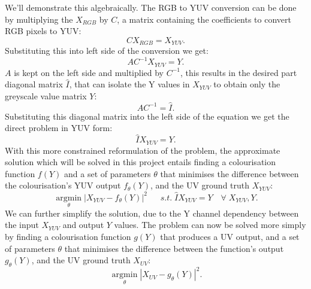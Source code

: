 \documentclass{l4proj}
\begin{document}
We'll demonstrate this algebraically. The RGB to YUV conversion can be done by multiplying the $X_{RGB}$ by $C$, a matrix containing the coefficients to convert RGB pixels to YUV:
\begin{equation}
    C X_{RGB} = X_{YUV}.
\end{equation}
Substituting this into left side of the conversion we get:
\begin{equation}
    A C^{-1} X_{YUV} = Y.
\end{equation}
$A$ is kept on the left side and multiplied by $C^{-1}$, this results in the desired part diagonal matrix $\hat{I}$, that can isolate the Y values in $X_{YUV}$ to obtain only the greyscale value matrix $Y$:
\begin{equation}
    A C^{-1} = \hat{I}.
\end{equation}
Substituting this diagonal matrix into the left side of the equation we get the direct problem in YUV form:
\begin{equation}
    \hat{I} X_{YUV} = Y.
\end{equation}
With this more constrained reformulation of the problem, the approximate solution which will be solved in this project entails finding a colourisation function $f(Y)$ and a set of parameters $\theta$ that minimises the difference between the colourisation's YUV output $f_{\theta}(Y)$, and the UV ground truth $X_{YUV}$:
\begin{equation}
    \underset{\theta}{\operatorname{arg min}} |X_{YUV}-f_{\theta}(Y)|^2 \quad\;\; s.t. \; \hat{I} X_{YUV} = Y \quad \forall \; X_{YUV}, Y.
\end{equation}
We can further simplify the solution, due to the Y channel dependency between the input $X_{YUV}$ and output $Y$ values. The problem can now be solved more simply by finding a colourisation function $g(Y)$ that produces a UV output, and a set of parameters $\theta$ that minimises the difference between the function's output $g_{\theta}(Y)$, and the UV ground truth $X_{UV}$:
\begin{equation}
    \underset{\theta}{\operatorname{arg min}} |X_{UV}-g_{\theta}(Y)|^2.
\end{equation}
\end{document}
